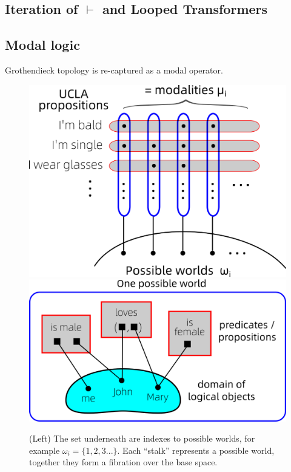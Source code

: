 \documentclass[runningheads]{llncs}
\begin{document}
\subsection{Iteration of $\vdash$ and Looped Transformers}

\subsection{Modal logic}

Grothendieck topology is re-captured as a modal operator.

\begin{figure}
	\includegraphics[scale=.4]{possible-worlds-as-sheaf.png} \qquad
	\includegraphics[scale=.35]{possible-world-single-example.png}
	\caption{(Left) The set underneath are indexes to possible worlds, for example $\omega_i = \{1,2,3...\}$. Each ``stalk'' represents a possible world, together they form a fibration over the base space.}
	\label{fig:possible-worlds-as-sheaf}
\end{figure}
\end{document}
